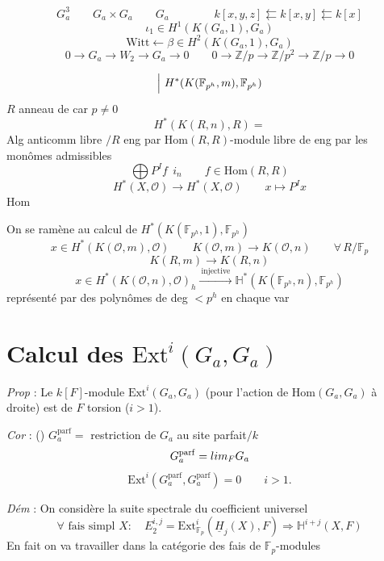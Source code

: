 \documentclass[11pt,a4paper]{article}
\begin{document}
\[
  G_a^3 \qquad G_a\times G_a \qquad G_a \qquad\qquad
  k[x,y,z] \leftleftarrows k[x,y] \leftleftarrows k[x]
\]
\[
  \iota_1 \in H^1(K(G_a,1),G_a)
\]
\[
  \text{Witt} \leftarrow \beta \in H^2(K(G_a,1),G_a)
\]
\[
  0 \to G_a \to W_2 \to G_a \to 0 \qquad
  0 \to \mathbb{Z}/p \to \mathbb{Z}/p^2 \to \mathbb{Z}/p \to 0
\]

\[
  \Bigl|\ H^{\ast}(K(\mathbb{F}_{p^h},m),\mathbb{F}_{p^h})
\]
$R$ anneau de car $p\neq 0$
\[
  H^{\ast}(K(R,n),R) = {}
\]
Alg anticomm libre $/R$ eng par $\mathrm{Hom}(R,R)$-module libre de eng par les monômes admissibles
\[
  \bigoplus P^If\ \ i_n \qquad f\in\mathrm{Hom}(R,R)
\]
\[
  H^{\ast}(X,\mathcal{O}) \to H^{\ast}(X,\mathcal{O}) \qquad x \mapsto P^Ix
\]
$\mathrm{Hom}$

On se ramène au calcul de $H^{\ast}(K(\mathbb{F}_{p^h},1),\mathbb{F}_{p^h})$
\[
  x\in H^{\ast}(K(\mathcal{O},m),\mathcal{O})
  \qquad K(\mathcal{O},m) \longrightarrow K(\mathcal{O},n)
  \qquad \forall\, R/\mathbb{F}_p
\]
\[
  K(R,m) \longrightarrow K(R,n)
\]
\[
  x\in H^{\ast}(K(\mathcal{O},n),\mathcal{O})_h \xrightarrow{\ \text{injective}\ }
  \mathbb{H}^{\ast}(K(\mathbb{F}_{p^h},n),\mathbb{F}_{p^h})
\]
représenté par des polynômes de deg $<p^h$ en chaque var

\section{Calcul des $\mathrm{Ext}^i(G_a,G_a)$}


\emph{Prop} : Le $k[F]$-module $\mathrm{Ext}^i(G_a,G_a)$ (pour l'action de $\mathrm{Hom}(G_a,G_a)$ à droite) est de $F$ torsion ($i>1$).

\emph{Cor} : () \quad $G_a^{\mathrm{parf}} = {}$ restriction de $G_a$ au site parfait$/k$
\[
  G_a^{\mathrm{parf}} = \varinjlim_{F} G_a
\]
\[
  \mathrm{Ext}^i(G_a^{\mathrm{parf}},G_a^{\mathrm{parf}}) = 0 \qquad i>1.
\]

\emph{Dém} : On considère la suite spectrale du coefficient universel
\[
  \forall \text{ fais simpl } X : \quad
  E_2^{i,j} = \mathrm{Ext}^i_{\mathbb{F}_p}(\underline{H}_j(X),F) \Longrightarrow \mathbb{H}^{i+j}(X,F)
\]
En fait on va travailler dans la catégorie des fais de $\mathbb{F}_p$-modules
\end{document}
